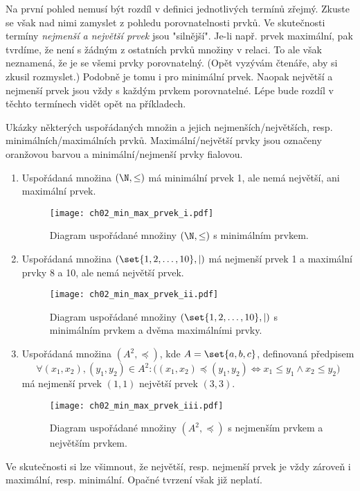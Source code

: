Na první pohled nemusí být rozdíl v definici jednotlivých termínů zřejmý. Zkuste se však nad nimi zamyslet z pohledu porovnatelnosti prvků. Ve skutečnosti termíny \emph{nejmenší a největší prvek} jsou "silnější". Je-li např. prvek maximální, pak tvrdíme, že není s žádným z ostatních prvků množiny v relaci. To ale však neznamená, že je se všemi prvky porovnatelný. (Opět vyzývám čtenáře, aby si zkusil rozmyslet.) Podobně je tomu i pro minimální prvek. Naopak největší a nejmenší prvek jsou vždy s každým prvkem porovnatelné. Lépe bude rozdíl v těchto termínech vidět opět na příkladech.
\begin{example}\label{ex:min_max_prvek}
    \sloppy Ukázky některých uspořádaných množin a jejich nejmenších/největších, resp. minimálních/maximálních prvků. Maximální/největší prvky jsou označeny oranžovou barvou a minimální/nejmenší prvky fialovou. 
    \begin{enumerate}[label=(\roman*)]
        \item\label{item:min_max_prvek_i} Uspořádaná množina $(\N,\leq)$ má minimální prvek 1, ale nemá největší, ani maximální prvek.
        \begin{figure}[H]
            \centering
            \texttt{[image: ch02\_min\_max\_prvek\_i.pdf]}
            \caption{Diagram uspořádané množiny $(\N,\leq)$ s minimálním prvkem.}
            \label{fig:min_max_prvek_i}
        \end{figure}
        \item\label{item:min_max_prvek_ii} Uspořádaná množina $(\set{1,2,\dots,10},\mid)$ má nejmenší prvek 1 a maximální prvky 8 a 10, ale nemá největší prvek.
        \begin{figure}[H]
            \centering
            \texttt{[image: ch02\_min\_max\_prvek\_ii.pdf]}
            \caption{Diagram uspořádané množiny $(\set{1,2,\dots,10},\mid)$ s minimálním prvkem a dvěma maximálními prvky.}
            \label{fig:min_max_prvek_ii}
        \end{figure}
        \item\label{item:min_max_prvek_iii} Uspořádaná množina $(A^2,\preceq)$, kde $A=\set{a,b,c}$, definovaná předpisem
        \begin{equation*}
            \forall (x_1,x_2),(y_1,y_2)\in A^2: \bigl((x_1,x_2)\preceq (y_1,y_2) \iff x_1\leq y_1 \land x_2\leq y_2\bigr)
        \end{equation*}
        má nejmenší prvek $(1,1)$ největší prvek $(3,3)$.
        \begin{figure}[H]
            \centering
            \texttt{[image: ch02\_min\_max\_prvek\_iii.pdf]}
            \caption{Diagram uspořádané množiny $(A^2,\preceq)$ s nejmenším prvkem a největším prvkem.}
            \label{fig:min_max_prvek_iii}
        \end{figure}
    \end{enumerate}
\end{example}
Ve skutečnosti si lze všimnout, že největší, resp. nejmenší prvek je vždy zároveň i maximální, resp. minimální. Opačné tvrzení však již neplatí.
